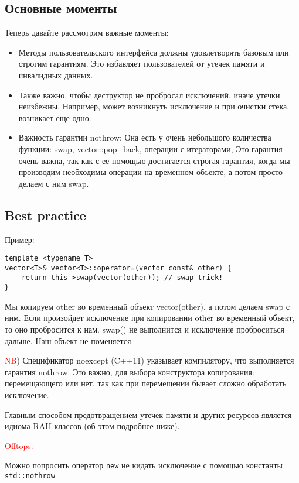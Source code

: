 \subsection{Основные моменты}

Теперь давайте рассмотрим важные моменты:
\begin{itemize}
\item Методы пользовательского интерфейса должны удовлетворять базовым или строгим гарантиям. Это избавляет пользователей от утечек памяти и инвалидных данных.

\item Также важно, чтобы деструктор не пробросал исключений, иначе утечки неизбежны. Например, может возникнуть исключение и при очистки стека, возникает еще одно.

\item Важность гарантии nothrow:
Она есть у очень небольшого количества функции: swap, vector::pop\_back, операции с итераторами, Это гарантия очень важна, так как с ее помощью достигается строгая гарантия, когда мы производим необходимы операции на временном объекте, а потом просто делаем с ним swap.
\end{itemize}

\subsection{Best practice}

Пример:
\begin{verbatim}
template <typename T>
vector<T>& vector<T>::operator=(vector const& other) {
    return this->swap(vector(other)); // swap trick!
}
\end{verbatim}

Мы копируем other во временный объект vector(other), а потом делаем swap с ним. Если произойдет исключение при копировании other во временный объект, то оно пробросится к нам. swap() не выполнится и исключение проброситься дальше. Наш объект не поменяется.

\textcolor{red}{NB}) Спецификатор noexcept (C++11) указывает компилятору, что выполняется гарантия nothrow. Это важно, для выбора конструктора копирования: перемещающего или нет, так как при перемещении бывает сложно обработать исключение.

Главным способом предотвращением утечек памяти и других ресурсов является идиома RAII-классов (об этом подробнее ниже).

\textcolor{red}{Offtops:}

Можно попросить оператор \texttt{new} не кидать исключение с помощью константы \texttt{std::nothrow}

